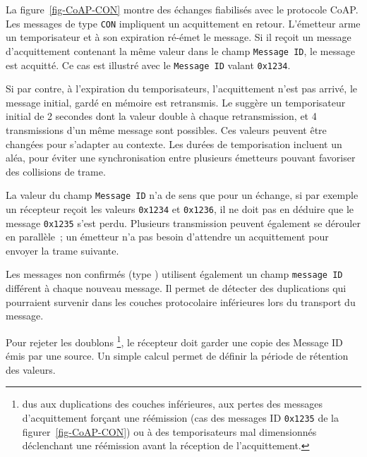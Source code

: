          \vspace{1em}

La figure~\vref{fig-CoAP-CON} montre des échanges fiabilisés avec le protocole CoAP. Les messages de type \texttt{CON} impliquent un acquittement en retour. L'émetteur arme un temporisateur et à son expiration ré-émet le message. Si il reçoit un message d'acquittement contenant la même valeur dans le champ \texttt{Message ID}, le message est acquitté. Ce cas est illustré avec le \texttt{Message ID} valant \texttt{0x1234}.

Si par contre, à l'expiration du temporisateurs, l'acquittement n'est pas arrivé, le message initial, gardé en mémoire est retransmis. Le  suggère un temporisateur initial de 2 secondes dont la valeur double à chaque retransmission, et 4 transmissions d'un même message sont possibles. Ces valeurs peuvent être changées pour s'adapter au contexte. Les durées de temporisation incluent un aléa, pour éviter une synchronisation entre plusieurs émetteurs pouvant favoriser des collisions de trame.

         \vspace{1em}

La valeur du champ \texttt{Message ID} n'a de sens que pour un échange, si par exemple un récepteur reçoit les valeurs \texttt{0x1234} et \texttt{0x1236}, il ne doit pas en déduire que le message \texttt{0x1235} s'est perdu. Plusieurs transmission peuvent également se dérouler en parallèle~; un émetteur n'a pas besoin d'attendre un acquittement pour envoyer la trame suivante. 

         \vspace{1em}


Les messages non confirmés (type \texttt{}) utilisent également un champ \texttt{message ID} différent à chaque nouveau message. Il permet de détecter des duplications qui pourraient survenir dans les couches protocolaire inférieures lors du transport du message.

         \vspace{1em}

Pour rejeter les doublons \footnote{dus aux duplications des couches inférieures, aux pertes des messages d'acquittement forçant une réémission (cas des messages ID \texttt{0x1235} de la figurer~\vref{fig-CoAP-CON}) ou à des temporisateurs mal dimensionnés déclenchant une réémission avant la réception de l'acquittement.}, le récepteur doit garder une copie des Message ID émis par une source. Un simple calcul permet de définir la période de rétention des valeurs.

